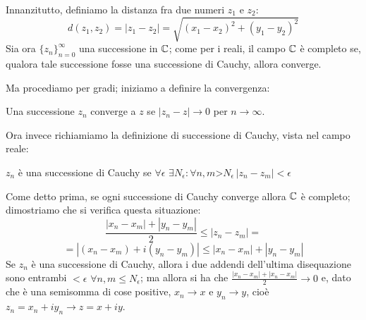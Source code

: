 
Innanzitutto, definiamo la distanza fra due numeri $z_1$ e $z_2$:
$$d(z_1,z_2)=|z_1-z_2|=\sqrt{(x_1-x_2)^2+(y_1-y_2)^2}$$
Sia ora $\{z_n\}_{n=0}^{\infty}$ una successione in $\mathbb{C}$; come per i reali, il campo $\mathbb{C}$ è completo se, qualora tale successione fosse una successione di Cauchy, allora converge.

Ma procediamo per gradi; iniziamo a definire la convergenza:

\begin{definizione}
 Una successione $z_n$ converge a $z$ se $|z_n-z|\to0$ per $n\to\infty$.
\end{definizione} Ora invece richiamiamo la definizione di successione di Cauchy, vista nel campo reale:
\begin{definizione}
$z_n$ è una successione di Cauchy se $\forall \epsilon$  $\exists N_{\epsilon} : \forall n,m$>$N_{\epsilon} \, |z_n-z_m| < \epsilon$
\end{definizione} Come detto prima, se ogni successione di Cauchy converge allora $\mathbb{C}$ è completo; dimostriamo che si verifica questa situazione:
$$\frac{|x_n-x_m|+|y_n-y_m|}{2}\leq |z_n-z_m|=$$
$$=|(x_n-x_m)+i(y_n-y_m)|\leq |x_n-x_m|+|y_n-y_m|$$
Se $z_n$ è una successione di Cauchy, allora i due addendi dell'ultima disequazione sono entrambi $<\epsilon$ $\forall n,m\leq N_{\epsilon}$; ma allora si ha che $\frac{|x_n-x_m|+|x_n-x_m|}{2} \to 0$ e, dato che è una semisomma di cose positive, $x_n\to x$ e $y_n\to y$, cioè $z_n=x_n+iy_n \to z=x+iy$.

